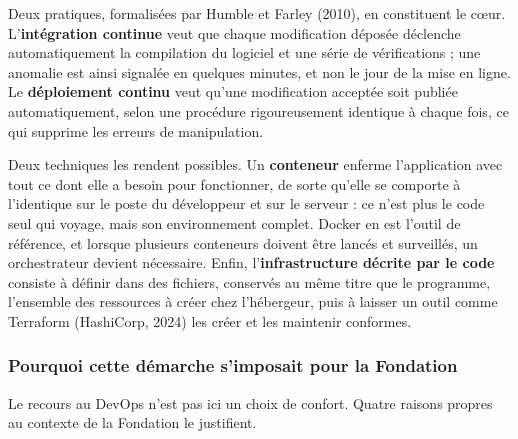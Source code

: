 Deux pratiques, formalisées par Humble et Farley (2010), en constituent le cœur.
L'\textbf{intégration continue} veut que chaque modification déposée déclenche
automatiquement la compilation du logiciel et une série de vérifications ; une
anomalie est ainsi signalée en quelques minutes, et non le jour de la mise en
ligne. Le \textbf{déploiement continu} veut qu'une modification acceptée soit
publiée automatiquement, selon une procédure rigoureusement identique à chaque
fois, ce qui supprime les erreurs de manipulation.

Deux techniques les rendent possibles. Un \textbf{conteneur} enferme
l'application avec tout ce dont elle a besoin pour fonctionner, de sorte qu'elle
se comporte à l'identique sur le poste du développeur et sur le serveur : ce
n'est plus le code seul qui voyage, mais son environnement complet. Docker en
est l'outil de référence, et lorsque plusieurs conteneurs doivent être lancés et
surveillés, un orchestrateur devient nécessaire. Enfin,
l'\textbf{infrastructure décrite par le code} consiste à définir dans des
fichiers, conservés au même titre que le programme, l'ensemble des ressources à
créer chez l'hébergeur, puis à laisser un outil comme Terraform (HashiCorp,
2024) les créer et les maintenir conformes.

\subsubsection{Pourquoi cette démarche s'imposait pour la Fondation}

Le recours au DevOps n'est pas ici un choix de confort. Quatre raisons propres
au contexte de la Fondation le justifient.

